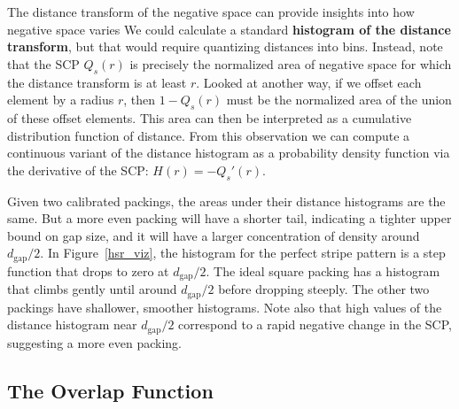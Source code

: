 The distance transform of the negative space can 
provide insights into how negative space varies
We could calculate a standard \textbf{histogram of the
distance transform}, but that would require quantizing distances into bins.
Instead, note that the SCP $Q_s(r)$ is precisely the normalized area of 
negative space for which the distance transform is at least $r$. 
Looked at another way, if we offset each element by a
radius $r$, then $1-Q_s(r)$ must be the normalized 
area of the union of these offset elements.
This area can then be interpreted as 
a cumulative distribution function of distance.  From this observation
we can compute a continuous variant of the distance histogram as a 
probability density function via the derivative of the SCP: $H(r)=-Q_s'(r)$.


Given two calibrated packings, the areas under their distance histograms
are the same.  But a more even packing will have a shorter tail,
indicating a tighter upper bound on gap size, and it will have a larger
concentration of density around $d_\mathrm{gap}/2$.  In Figure~\ref{hsr_viz},
the histogram for the perfect stripe pattern is a step function that drops
to zero at $d_\mathrm{gap}/2$.  The ideal square packing has a histogram
that climbs gently until around $d_\mathrm{gap}/2$ before dropping
steeply.  The other two packings have shallower, smoother histograms.
Note also that high values of the distance histogram near $d_\mathrm{gap}/2$
correspond to a rapid negative change in the SCP, suggesting a more even
packing.




\subsection{The Overlap Function}
\label{section_overlap_function}


